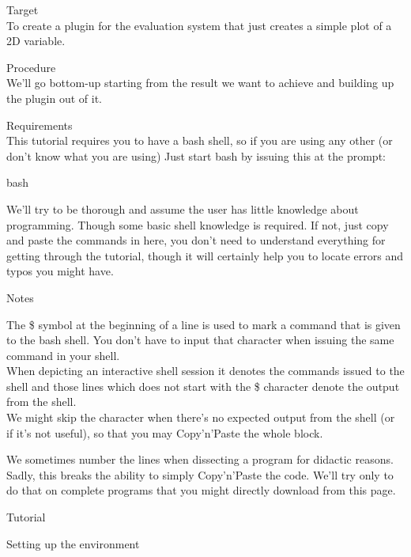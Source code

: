 \documentclass[a4paper,11pt]{ltxdoc}
\begin{document}
Target\\
To create a plugin for the evaluation system that just creates a simple plot of a 2D variable.

Procedure\\
We'll go bottom-up starting from the result we want to achieve and building up the plugin out of it.

Requirements\\

This tutorial requires you to have a bash shell, so if you are using any other (or don't know what you are using) Just start bash by issuing this at the prompt:

bash

We'll try to be thorough and assume the user has little knowledge about programming. Though some basic shell knowledge is required.
If not, just copy and paste the commands in here, you don't need to understand everything for getting through the tutorial, though it will certainly help you to locate errors and typos you might have.

Notes

The \$ symbol at the beginning of a line is used to mark a command that is given to the bash shell. You don't have to input that character when issuing the same command in your shell.\\
When depicting an interactive shell session it denotes the commands issued to the shell and those lines which does not start with the \$ character denote the output from the shell.\\
We might skip the character when there's no expected output from the shell (or if it's not useful), so that you may Copy'n'Paste the whole block.

We sometimes number the lines when dissecting a program for didactic reasons. Sadly, this breaks the ability to simply Copy'n'Paste the code. We'll try only to do that on complete programs that you might directly download from this page.

Tutorial

Setting up the environment
\end{document}
